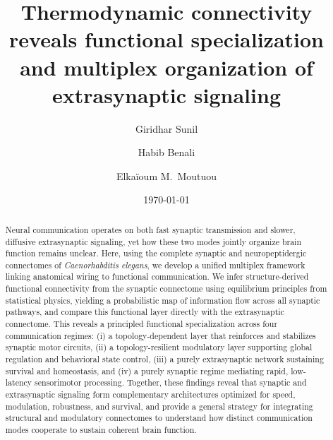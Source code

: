 \documentclass[prx,superscriptaddres, twocolumn]{revtex4-2}
\begin{document}
\title{Thermodynamic connectivity reveals functional specialization and multiplex organization of extrasynaptic signaling}
\author{Giridhar Sunil}
\author{Habib Benali}
\author{Elka\"ioum M.~Moutuou}


\date{\today}

\begin{abstract}
Neural communication operates on both fast synaptic transmission and slower, diffusive
extrasynaptic signaling, yet how these two modes jointly organize brain function remains
unclear. Here, using the complete synaptic and neuropeptidergic connectomes of
\emph{Caenorhabditis elegans}, we develop a unified multiplex framework linking anatomical
wiring to functional communication. We infer structure-derived functional connectivity
from the synaptic connectome using equilibrium principles from statistical physics,
yielding a probabilistic map of information flow across all synaptic pathways, and compare
this functional layer directly with the extrasynaptic connectome. This reveals a principled
functional specialization across four communication regimes: (i) a topology-dependent
layer that reinforces and stabilizes synaptic motor circuits, (ii) a topology-resilient
modulatory layer supporting global regulation and behavioral state control, (iii) a purely
extrasynaptic network sustaining survival and homeostasis, and (iv) a purely synaptic
regime mediating rapid, low-latency sensorimotor processing. Together, these findings
reveal that synaptic and extrasynaptic signaling form complementary architectures
optimized for speed, modulation, robustness, and survival, and provide a general strategy
for integrating structural and modulatory connectomes to understand how distinct
communication modes cooperate to sustain coherent brain function.

\end{abstract}
\end{document}
